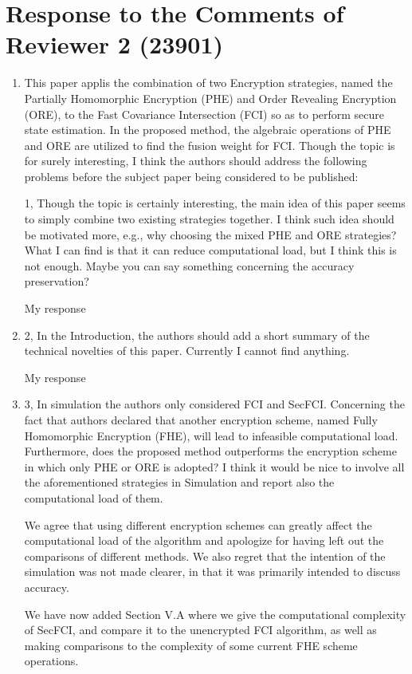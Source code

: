 \documentclass[a4paper]{scrartcl}
\newenvironment{rebuttal}{\begin{enumerate}[label={\color{grey}\thesection.\arabic{enumi}},leftmargin=0pt,ref=\thesection.\arabic{enumi}]}{\end{enumerate}}
\newcommand{\reviewtext}[1]{{\color{nblue} #1}}
\begin{document}
\section*{Response to the Comments of Reviewer 2 (23901)}
\def\thesection{R2}
\begin{rebuttal}
\item \reviewtext{This paper applis the combination of two Encryption strategies, named
the Partially Homomorphic Encryption (PHE) 
and Order Revealing Encryption (ORE), to the Fast Covariance
Intersection (FCI) so as to perform secure state estimation. In the
proposed method, the algebraic operations of PHE and ORE are utilized
to find the fusion weight for FCI. Though the topic is for surely
interesting, I think the authors should address the following problems
before the subject paper being considered to be published:

1, Though the topic is certainly interesting, the main idea of this
paper seems to simply combine two existing strategies together. I think
such idea should be motivated more, e.g., why choosing the mixed PHE
and ORE strategies? What I can find is that it can reduce computational
load, but I think this is not enough. Maybe you can say something
concerning the accuracy preservation? }

My response

\item \reviewtext{2, In the Introduction, the authors should add a short summary of the
technical novelties of this paper. Currently I cannot find anything.}

My response

\item \reviewtext{3, In simulation the authors only considered FCI and SecFCI. Concerning
the fact that authors declared that another encryption scheme, named
Fully Homomorphic Encryption (FHE), will lead to infeasible
computational load. Furthermore, does the proposed method outperforms
the encryption scheme in which only PHE or ORE is adopted? I think it
would be nice to involve all the aforementioned strategies in
Simulation and report also the computational load of them.}

We agree that using different encryption schemes can greatly affect the computational load of the algorithm and apologize for having left out the comparisons of different methods. We also regret that the intention of the simulation was not made clearer, in that it was primarily intended to discuss accuracy.

We have now added Section V.A where we give the computational complexity of SecFCI, and compare it to the unencrypted FCI algorithm, as well as making comparisons to the complexity of some current FHE scheme operations.


\end{rebuttal}
\end{document}
